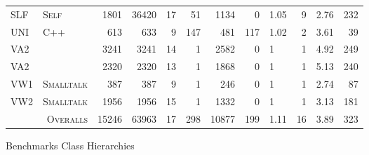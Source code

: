 \begin{figure}[htbp]
\begin{tabular}{@{ }l@{ }||@{ }l@{ }|@{ }r@{ }|@{ }r@{ }|@{ }r@{ }|@{ }r@{ }|@{ }r@{ }|@{ }r@{ }|@{ }l@{ }|@{ }r@{ }|@{ }r@{ }|@{ }r@{ }}
 SLF & \tiny{\textsc{Self}}        & 1801 & 36420 & 17 &  51 & 1134 &   0 & 1.05 &  9 & 2.76 & 232 \\ %
 UNI & \tiny{\textsc{C++}}         &  613 &   633 &  9 & 147 &  481 & 117 & 1.02 &  2 & 3.61 &  39 \\ %
 VA2 & \tiny{\textsc{  }}          & 3241 &  3241 & 14 &   1 & 2582 &   0 & 1    &  1 & 4.92 & 249 \\ %
 VA2 & \tiny{\textsc{  }}          & 2320 &  2320 & 13 &   1 & 1868 &   0 & 1    &  1 & 5.13 & 240 \\ %
 VW1 & \tiny{\textsc{Smalltalk}}   &  387 &   387 &  9 &   1 &  246 &   0 & 1    &  1 & 2.74 &  87 \\ %
 VW2 & \tiny{\textsc{Smalltalk}}   & 1956 &  1956 & 15 &   1 & 1332 &   0 & 1    &  1 & 3.13 & 181 \\ %
\hline %
\multicolumn{2}{r|}{\tiny{\textsc{Overalls}}} &15246 & 63963 & 17 & 298 &10877 & 199 & 1.11 & 16 & 3.89 & 323 \\ %
\hline %
\end{tabular}
\caption{Benchmarks Class Hierarchies}
\label{fig:benchmarks}
\end{figure}

